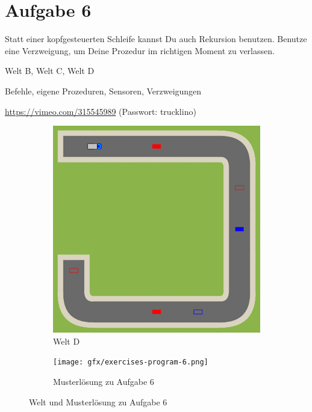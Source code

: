 \pagebreak

\section*{Aufgabe 6}
\label{sec:exercises:6}

Statt einer kopfgesteuerten Schleife kannst Du auch Rekursion benutzen. Benutze eine Verzweigung, um Deine Prozedur im richtigen Moment zu verlassen.

\begin{description}[noitemsep]
  \item[Welt wählen:] Welt B, Welt C, Welt D
  \item[Du brauchst:] Befehle, eigene Prozeduren, Sensoren, Verzweigungen
  \item[Video:] \url{https://vimeo.com/315545989} (Passwort: trucklino)
\end{description}

\begin{figure}[H]
  \begin{subfigure}[b]{0.40\textwidth}
    \includegraphics[width=\textwidth]{gfx/exercises-world-d.png}
    \caption{Welt D}
  \end{subfigure}\hfill
  \begin{subfigure}[b]{0.40\textwidth}
    \texttt{[image: gfx/exercises-program-6.png]}
    \caption{Musterlösung zu Aufgabe 6}
  \end{subfigure}\hfill
  \caption{Welt und Musterlösung zu Aufgabe 6}
\end{figure}

